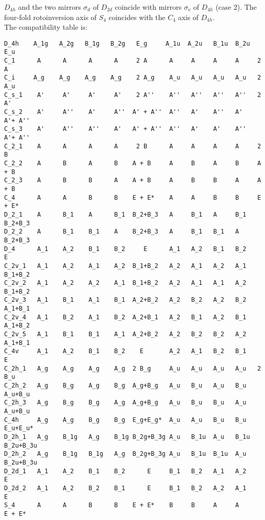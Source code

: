 \documentclass[12pt,a4paper]{article}
\begin{document}
$D_{4h}$ and the two mirrors $\sigma_d$ of $D_{2d}$ 
coincide with mirrors $\sigma_v$ of $D_{4h}$ (case 2).
The four-fold rotoinversion axis of $S_4$ coincides with the $C_4$ axis of 
$D_{4h}$. \\
The compatibility table is:
\begin{footnotesize}
\begin{verbatim}
D_4h    A_1g   A_2g   B_1g   B_2g   E_g     A_1u  A_2u   B_1u  B_2u  E_u
C_1      A      A      A      A     2 A      A     A     A     A     2 A
C_i     A_g    A_g    A_g    A_g    2 A_g    A_u   A_u   A_u   A_u   2 A_u
C_s_1    A'     A'     A'     A'    2 A''    A''   A''   A''   A''   2 A'
C_s_2    A'     A''    A'     A''  A' + A''  A''   A'    A''   A'    A'+ A''
C_s_3    A'     A''    A''    A'   A' + A''  A''   A'    A'    A''   A'+ A''
C_2_1    A      A      A      A     2 B      A     A     A     A     2 B
C_2_2    A      B      A      B    A + B     A     B     A     B     A + B 
C_2_3    A      B      B      A    A + B     A     B     B     A     A + B
C_4      A      A      B      B    E + E*    A     A     B     B     E + E*    
D_2_1    A      B_1    A      B_1  B_2+B_3   A     B_1   A     B_1   B_2+B_3
D_2_2    A      B_1    B_1    A    B_2+B_3   A     B_1   B_1   A     B_2+B_3
D_4      A_1    A_2    B_1    B_2     E      A_1   A_2   B_1   B_2     E 
C_2v_1   A_1    A_2    A_1    A_2  B_1+B_2   A_2   A_1   A_2   A_1   B_1+B_2
C_2v_2   A_1    A_2    A_2    A_1  B_1+B_2   A_2   A_1   A_1   A_2   B_1+B_2
C_2v_3   A_1    B_1    A_1    B_1  A_2+B_2   A_2   B_2   A_2   B_2   A_1+B_1
C_2v_4   A_1    B_2    A_1    B_2  A_2+B_1   A_2   B_1   A_2   B_1   A_1+B_2
C_2v_5   A_1    B_1    B_1    A_1  A_2+B_2   A_2   B_2   B_2   A_2   A_1+B_1
C_4v     A_1    A_2    B_1    B_2    E       A_2   A_1   B_2   B_1     E
C_2h_1   A_g    A_g    A_g    A_g  2 B_g     A_u   A_u   A_u   A_u   2 B_u
C_2h_2   A_g    B_g    A_g    B_g  A_g+B_g   A_u   B_u   A_u   B_u   A_u+B_u
C_2h_3   A_g    B_g    B_g    A_g  A_g+B_g   A_u   B_u   B_u   A_u   A_u+B_u
C_4h     A_g    A_g    B_g    B_g  E_g+E_g*  A_u   A_u   B_u   B_u   E_u+E_u*
D_2h_1   A_g    B_1g   A_g    B_1g B_2g+B_3g A_u   B_1u  A_u   B_1u  B_2u+B_3u
D_2h_2   A_g    B_1g   B_1g   A_g  B_2g+B_3g A_u   B_1u  B_1u  A_u   B_2u+B_3u
D_2d_1   A_1    A_2    B_1    B_2      E     B_1   B_2   A_1   A_2      E  
D_2d_2   A_1    A_2    B_2    B_1      E     B_1   B_2   A_2   A_1      E
S_4      A      A      B      B    E + E*    B     B     A     A      E + E* 
\end{verbatim}
\end{footnotesize}
\end{document}
